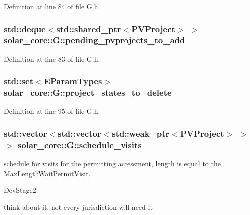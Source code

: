 Definition at line 84 of file G.\+h.

\hypertarget{classsolar__core_1_1_g_a053a3d2c00c5af66925ebe359c4b4228}{}
\subsubsection[{pending\+\_\+pvprojects\+\_\+to\+\_\+add}]{\setlength{\rightskip}{0pt plus 5cm}std\+::deque$<$std\+::shared\+\_\+ptr$<${\bf P\+V\+Project}$>$ $>$ solar\+\_\+core\+::\+G\+::pending\+\_\+pvprojects\+\_\+to\+\_\+add\hspace{0.3cm}{\ttfamily [protected]}}\label{classsolar__core_1_1_g_a053a3d2c00c5af66925ebe359c4b4228}


Definition at line 83 of file G.\+h.

\hypertarget{classsolar__core_1_1_g_a26b220870264c1927d282dfe9412725e}{}
\subsubsection[{project\+\_\+states\+\_\+to\+\_\+delete}]{\setlength{\rightskip}{0pt plus 5cm}std\+::set$<${\bf E\+Param\+Types}$>$ solar\+\_\+core\+::\+G\+::project\+\_\+states\+\_\+to\+\_\+delete\hspace{0.3cm}{\ttfamily [protected]}}\label{classsolar__core_1_1_g_a26b220870264c1927d282dfe9412725e}


Definition at line 95 of file G.\+h.

\hypertarget{classsolar__core_1_1_g_a33472d3b331a303ec8a9b61e2da163d3}{}
\subsubsection[{schedule\+\_\+visits}]{\setlength{\rightskip}{0pt plus 5cm}std\+::vector$<$std\+::vector$<$std\+::weak\+\_\+ptr$<${\bf P\+V\+Project}$>$ $>$ $>$ solar\+\_\+core\+::\+G\+::schedule\+\_\+visits\hspace{0.3cm}{\ttfamily [protected]}}\label{classsolar__core_1_1_g_a33472d3b331a303ec8a9b61e2da163d3}
schedule for visits for the permitting accessment, length is equal to the Max\+Length\+Wait\+Permit\+Visit.\begin{DoxyRefDesc}{Dev\+Stage2}
\item[\hyperlink{_dev_stage2__DevStage2000002}{Dev\+Stage2}]think about it, not every jurisdiction will need it \end{DoxyRefDesc}


